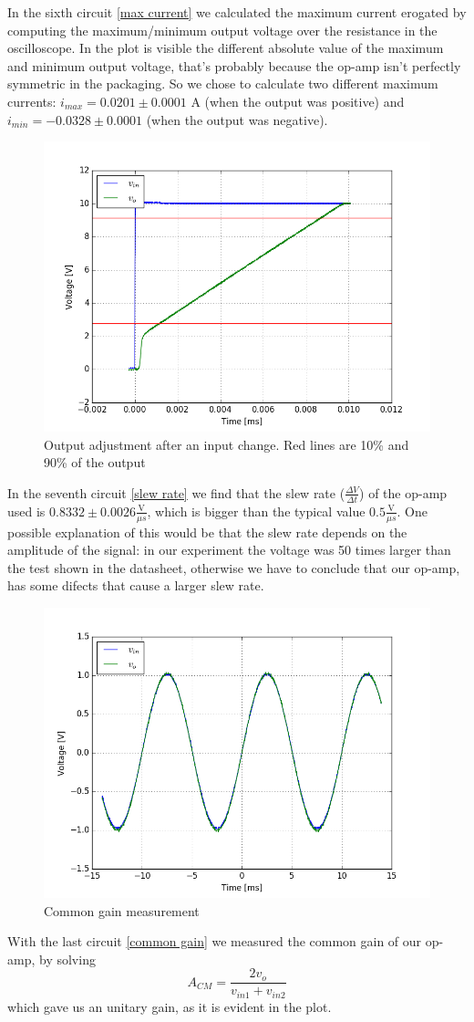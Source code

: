 In the sixth circuit \eqref{max current} we calculated the maximum current erogated by computing the maximum/minimum output voltage over the resistance in the oscilloscope. In the plot is visible the different absolute value of the maximum and minimum output voltage, that's probably because the op-amp isn't perfectly symmetric in the packaging. So we chose to calculate two different maximum currents: $i_{max} = 0.0201 \pm 0.0001$ A (when the output was positive) and $i_{min} = -0.0328 \pm 0.0001$ (when the output was negative).
\begin{figure}[H]
\centering
\includegraphics[width=.6\textwidth]{3/Slew_Ratio.png}
\caption{Output adjustment after an input change. Red lines are 10\% and 90\% of the output}
\end{figure}
In the seventh circuit \eqref{slew rate} we find that the slew rate ($\frac{\Delta V}{\Delta t}$) of the op-amp used is $0.8332 \pm 0.0026 \frac{\text{V}}{\mu s}$, which is bigger than the typical value $0.5 \frac{\text{V}}{\mu s}$. One possible explanation of this would be that the slew rate depends on the amplitude of the signal: in our experiment the voltage was 50 times larger than the test shown in the datasheet, otherwise we have to conclude that our op-amp, has some difects that cause a larger slew rate.
\begin{figure}[H]
\centering
\includegraphics[width=.7\textwidth]{3/Amplification_in_common_mode.png}
\caption{Common gain measurement}
\end{figure}
With the last circuit \eqref{common gain} we measured the common gain of our op-amp, by solving
\[A_{CM} = \frac{2 v_{o}}{v_{in1} + v_{in2}}\]
which gave us an unitary gain, as it is evident in the plot.
